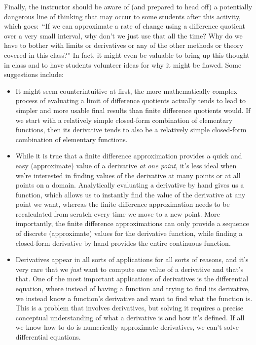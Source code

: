 Finally, the instructor should be aware of (and prepared to head off) a potentially dangerous line of thinking that may occur to some students after this activity, which goes:~``If we can approximate a rate of change using a difference quotient over a very small interval, why don't we just use that all the time? Why do we have to bother with limits or derivatives or any of the other methods or theory covered in this class?'' In fact, it might even be valuable to bring up this thought in class and to have students volunteer ideas for why it might be flawed. Some suggestions include:
\begin{itemize}
	\item It might seem counterintuitive at first, the more mathematically complex process of evaluating a limit of difference quotients actually tends to lead to simpler and more usable final results than finite difference quotients would. If we start with a relatively simple closed-form combination of elementary functions, then its derivative tends to also be a relatively simple closed-form combination of elementary functions.
	\item While it is true that a finite difference approximation provides a quick and easy (approximate) value of a derivative \textit{at one point}, it's less ideal when we're interested in finding values of the derivative at many points or at all points on a domain. Analytically evaluating a derivative by hand gives us a function, which allows us to instantly find the value of the derivative at any point we want, whereas the finite difference approximation needs to be recalculated from scratch every time we move to a new point. More importantly, the finite difference approximations can only provide a sequence of discrete (approximate) values for the derivative function, while finding a closed-form derivative by hand provides the entire continuous function.
	\item Derivatives appear in all sorts of applications for all sorts of reasons, and it's very rare that we \textit{just} want to compute one value of a derivative and that's that. One of the most important applications of derivatives is the differential equation, where instead of having a function and trying to find its derivative, we instead know a function's derivative and want to find what the function is. This is a problem that involves derivatives, but solving it requires a precise conceptual understanding of what a derivative is and how it's defined. If all we know how to do is numerically approximate derivatives, we can't solve differential equations.
\end{itemize}


